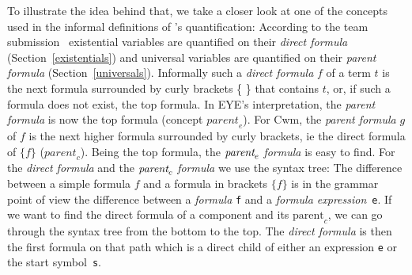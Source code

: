 To illustrate the idea behind that, we 
%
take  a closer look at one of the concepts used in the informal definitions of \nthree's quantification: %
According to the \wwwc team submission~\cite{Notation3} existential variables are quantified on their \emph{direct formula} (Section~\ref{existentials}) and 
universal variables are quantified on their \emph{parent formula} (Section~\ref{universals}). %
%
%
%
\label{parentformula}
Informally 
such a \emph{direct formula} $f$ of a term $t$ is the next formula surrounded by curly brackets \{ \} that contains $t$, or, if such a formula does not exist, 
the top formula. 
In EYE's interpretation, the \emph{parent formula} is now the top formula (concept $\textit{parent}_e$). 
For Cwm, the \emph{parent formula} $g$ of $f$ is the next higher formula surrounded by curly brackets, ie the direct formula of $\{f\}$ ($\textit{parent}_c$). %
%
Being the top formula, the $\emph{parent}_e$ \emph{formula} is easy to find. For the \emph{direct formula} and the $\emph{parent}_c$ \emph{formula} we use the syntax tree:
The difference between a simple formula $f$ and a formula in brackets $\{f\}$ is in the grammar point of view the difference between
a \emph{formula} \texttt{f} and a \emph{formula expression}~\texttt{e}.
If we want to find the direct formula of a component and its $\text{parent}_c$, we can go through the syntax tree from the bottom to the top.  
The \emph{direct formula} is then the first formula on that path which is a direct child of either an expression \texttt{e}  or the start symbol~\texttt{s}. 
